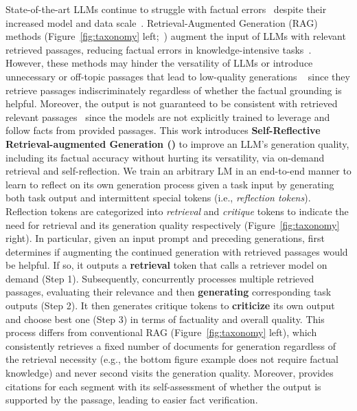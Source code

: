 State-of-the-art LLMs continue to struggle with factual errors~\citep{mallen2022not,min2023factscore} despite their increased model and data scale~\citep{ouyang2022training}. 
Retrieval-Augmented Generation (RAG) methods (Figure~\ref{fig:taxonomy} left;~\citealt{lewis2020retrieval,guu2020retrieval}) augment the input of LLMs with relevant retrieved passages,  reducing factual errors in knowledge-intensive tasks~\citep{ram2023context, asai-etal-2023-retrieval}. 
However, these methods may hinder the versatility of LLMs or introduce unnecessary or off-topic passages that lead to low-quality generations ~\citep{pmlr-v202-shi23a} since they retrieve passages indiscriminately regardless of whether the factual grounding is helpful.
Moreover, the output is not guaranteed to be consistent with retrieved relevant passages~\citep{gao2023enabling} since the models are not explicitly trained to leverage and follow facts from provided passages. 
This work introduces {\bf Self-Reflective Retrieval-augmented Generation (\model)} to improve an LLM's generation quality, including its factual accuracy without hurting its versatility, via on-demand retrieval and self-reflection. 
We train an arbitrary LM in an end-to-end manner to learn to reflect on its own generation process given a task input by generating both task output and intermittent special tokens (i.e., \textit{reflection tokens}). Reflection tokens are categorized into \textit{retrieval} and \textit{critique} tokens to indicate the need for retrieval and its generation quality respectively (Figure~\ref{fig:taxonomy} right). 
{
In particular, given an input prompt and preceding generations, \model first determines if augmenting the continued generation with retrieved passages would be helpful. If so, 
it outputs a {\bf retrieval} token that calls a retriever model on demand (Step 1). 
Subsequently, \model concurrently processes multiple retrieved passages, evaluating their relevance and then {\bf generating} corresponding task outputs (Step 2). It then generates critique tokens to \textbf{criticize} its own output and choose best one (Step 3) in terms of factuality and overall quality. 
This process differs from conventional RAG (Figure~\ref{fig:taxonomy} left), which consistently retrieves a fixed number of documents for generation regardless of the retrieval necessity (e.g., the bottom figure example does not require factual knowledge) and never second visits the generation quality.
Moreover, \model provides citations for each segment with its self-assessment of whether the output is supported by the passage, leading to easier fact verification. }

